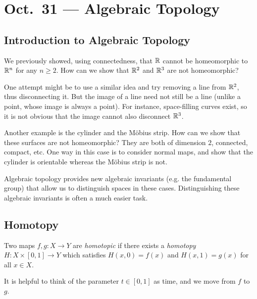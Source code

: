 \chapter{Oct.~31 --- Algebraic Topology}

\section{Introduction to Algebraic Topology}

\begin{remark}
  We previously showed, using connectedness, that
  $\mathbb{R}$ cannot be homeomorphic to $\mathbb{R}^n$ for any
  $n \ge 2$. How can we show that $\mathbb{R}^2$ and
  $\mathbb{R}^3$ are not homeomorphic?

  One attempt might be to use a similar idea and
  try removing a line from $\mathbb{R}^2$, thus disconnecting
  it. But the image of
  a line need not still be a line (unlike a point, whose
  image is always a point). For instance,
  space-filling curves exist, so it is not obvious
  that the image cannot also disconnect $\mathbb{R}^3$.

  Another example is the cylinder and the M\"obius
  strip. How can we show that these surfaces are
  not homeomorphic? They are both of dimension $2$,
  connected, compact, etc. One way in this case
  is to consider normal maps, and show that the cylinder
  is orientable whereas the M\"obius strip is not.

  Algebraic topology provides new algebraic invariants
  (e.g. the fundamental group)
  that allow us to distinguish spaces in these cases.
  Distinguishing these algebraic invariants is
  often a much easier task.
\end{remark}

\section{Homotopy}
\begin{definition}
  Two maps $f, g : X \to Y$ are
  \emph{homotopic} if there exists a \emph{homotopy}
  $H : X \times [0, 1] \to Y$ which satisfies
  $H(x, 0) = f(x)$ and $H(x, 1) = g(x)$ for all
  $x \in X$.
\end{definition}

\begin{remark}
  It is helpful to think of the parameter
  $t \in [0, 1]$ as time, and we move from $f$ to $g$.
\end{remark}

